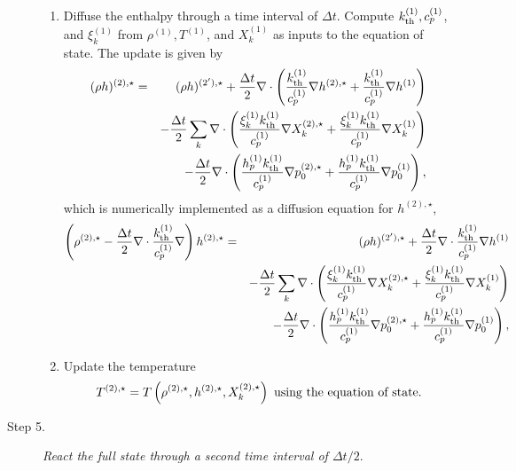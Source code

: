 \documentclass[11pt]{article}
\newcommand{\kth}{k_{\rm th}}
\newcommand{\dt}{\Delta t}
\begin{document}
\begin{description}
\begin{enumerate}
\item Diffuse the enthalpy through a time interval of $\dt$.  Compute $\kth^{(1)}, c_p^{(1)}$, and $\xi_k^{(1)}$ from $\rho^{(1)}, T^{(1)}$, and $X_k^{(1)}$ as inputs to the equation of state.  The update is given by
\begin{eqnarray}
(\rho h)^{(2),\star} &=& (\rho h)^{(2'),\star} + \frac{\dt}{2}\nabla\cdot\left(\frac{\kth^{(1)}}{c_p^{(1)}}\nabla h^{(2),\star} + \frac{\kth^{(1)}}{c_p^{(1)}}\nabla h^{(1)}\right)\nonumber\\
&&- \frac{\dt}{2}\sum_k\nabla\cdot\left(\frac{\xi_k^{(1)}\kth^{(1)}}{c_p^{(1)}}\nabla X_k^{(2),\star} + \frac{\xi_k^{(1)}\kth^{(1)}}{c_p^{(1)}}\nabla X_k^{(1)}\right)\nonumber\\
&&- \frac{\dt}{2}\nabla\cdot\left(\frac{h_p^{(1)}\kth^{(1)}}{c_p^{(1)}}\nabla p_0^{(2),\star} + \frac{h_p^{(1)}\kth^{(1)}}{c_p^{(1)}}\nabla p_0^{(1)}\right),
\end{eqnarray}
which is numerically implemented as a diffusion equation for $h^{(2),\star}$,
\begin{eqnarray}
\left(\rho^{(2),\star} - \frac{\dt}{2}\nabla\cdot\frac{\kth^{(1)}}{c_p^{(1)}}\nabla\right)h^{(2),\star} &=& (\rho h)^{(2'),\star} + \frac{\dt}{2}\nabla\cdot\frac{\kth^{(1)}}{c_p^{(1)}}\nabla h^{(1)}\nonumber\\
&&- \frac{\dt}{2}\sum_k\nabla\cdot\left(\frac{\xi_k^{(1)}\kth^{(1)}}{c_p^{(1)}}\nabla X_k^{(2),\star} + \frac{\xi_k^{(1)}\kth^{(1)}}{c_p^{(1)}}\nabla X_k^{(1)}\right)\nonumber\\
&&- \frac{\dt}{2}\nabla\cdot\left(\frac{h_p^{(1)}\kth^{(1)}}{c_p^{(1)}}\nabla p_0^{(2),\star} + \frac{h_p^{(1)}\kth^{(1)}}{c_p^{(1)}}\nabla p_0^{(1)}\right),
\end{eqnarray}
\item Update the temperature
\begin{equation}
T^{(2),\star} = T\left(\rho^{(2),\star}, h^{(2),\star}, X_k^{(2),\star}\right) {\hbox{ \rm using the equation of state.}}
\end{equation}

\end{enumerate}

\item[Step 5.] {\em React the full state through a second time interval of $\dt / 2.$}

\begin{enumerate}
\renewcommand{\theenumi}{{\bf \alph{enumi}}}


\end{enumerate}
\end{description}
\end{document}
